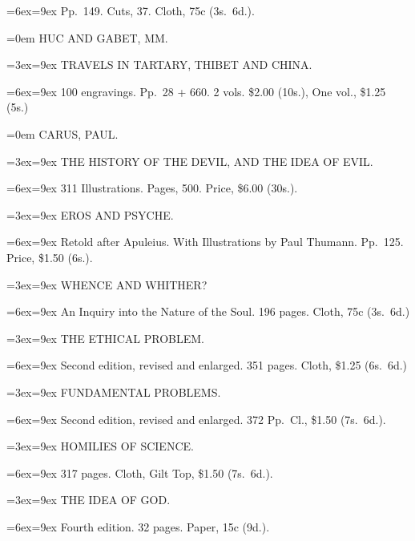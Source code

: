 \documentclass[oneside]{book}
\begin{document}
{\parindent=6ex\hangindent=9ex\footnotesize
Pp.~149. Cuts, 37. Cloth, 75c (3s.~6d.).
\smallskip

\parindent=0em \normalsize
HUC AND GABET, MM.
\nopagebreak

\parindent=3ex\hangindent=9ex \small
TRAVELS IN TARTARY, THIBET AND CHINA.
\nopagebreak

\parindent=6ex\hangindent=9ex\footnotesize
100 engravings. Pp.~28 + 660. 2 vols. \$2.00 (10s.), One vol., \$1.25 (5s.)
\smallskip


\parindent=0em \normalsize
CARUS, PAUL.
\nopagebreak

\parindent=3ex\hangindent=9ex \small
THE HISTORY OF THE DEVIL, AND THE IDEA OF EVIL.
\nopagebreak

\parindent=6ex\hangindent=9ex\footnotesize
311 Illustrations. Pages, 500. Price, \$6.00 (30s.).
\smallskip

\parindent=3ex\hangindent=9ex \small
EROS AND PSYCHE.
\nopagebreak

\parindent=6ex\hangindent=9ex\footnotesize
Retold after Apuleius. With Illustrations by Paul Thumann. Pp.~125.
Price, \$1.50 (6s.).
\smallskip

\parindent=3ex\hangindent=9ex \small
WHENCE AND WHITHER?
\nopagebreak

\parindent=6ex\hangindent=9ex\footnotesize
An Inquiry into the Nature of the Soul. 196 pages. Cloth, 75c (3s.~6d.)
\smallskip

\parindent=3ex\hangindent=9ex \small
THE ETHICAL PROBLEM.
\nopagebreak

\parindent=6ex\hangindent=9ex\footnotesize
Second edition, revised and enlarged. 351 pages. Cloth, \$1.25 (6s.~6d.)
\smallskip

\parindent=3ex\hangindent=9ex \small
FUNDAMENTAL PROBLEMS.
\nopagebreak

\parindent=6ex\hangindent=9ex\footnotesize
Second edition, revised and enlarged. 372 Pp.~Cl., \$1.50 (7s.~6d.).
\smallskip

\parindent=3ex\hangindent=9ex \small
HOMILIES OF SCIENCE.
\nopagebreak

\parindent=6ex\hangindent=9ex\footnotesize
317 pages. Cloth, Gilt Top, \$1.50 (7s.~6d.).
\smallskip

\parindent=3ex\hangindent=9ex \small
THE IDEA OF GOD.
\nopagebreak

\parindent=6ex\hangindent=9ex\footnotesize
Fourth edition. 32 pages. Paper, 15c (9d.).
\smallskip

}
\end{document}

